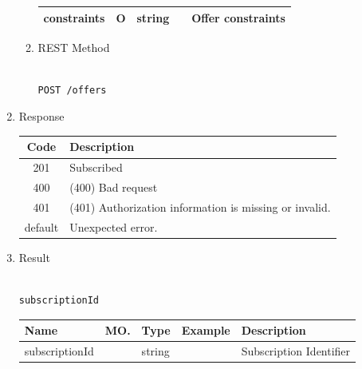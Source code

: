 \begin{enumerate}
\begin{enumerate}
\begin{center}
\begin{tabular}{|p{3cm}|l|p{3cm}|p{3cm}|p{4cm}|}
\hline

constraints	& O	& 	string	&		&	Offer constraints \\ 

\hline

\end{tabular}
\end{center}

\item REST Method

\begin{tcolorbox}[boxrule=0pt, frame empty]
\begin{verbatim} 

POST /offers

\end{verbatim}
\end{tcolorbox}

\end{enumerate}

\item Response

\begin{center}
\begin{tabular}{|c|l|} 
\hline
\rowcolor{lightgray}	Code 		& 	Description \\
\hline
201	 		&	Subscribed \\
\hline
400			&	(400) Bad request \\
\hline
401			&	(401) Authorization information is missing or invalid. \\
\hline
default		&	Unexpected error. \\
\hline
\end{tabular}
\end{center}


\item Result

\begin{tcolorbox}[boxrule=0pt, frame empty]
\begin{verbatim}

subscriptionId

\end{verbatim}
\end{tcolorbox}

\begin{center}
\begin{tabular}{|p{3cm}|l|p{3cm}|p{3cm}|p{4cm}|} 
\hline
\rowcolor{lightgray}	Name	& MO.	& Type	& Example & 	Description \\
\hline

subscriptionId	&	& 	string	&		&	Subscription Identifier \\ 


\end{tabular}
\end{center}
\end{enumerate}
